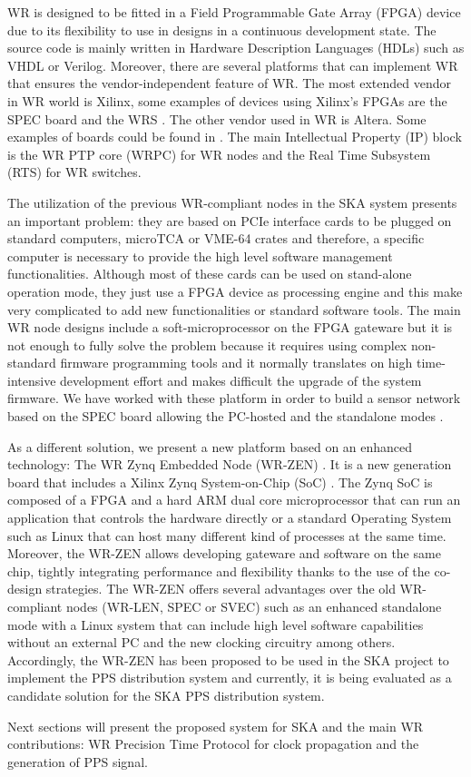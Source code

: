 
WR is designed to be fitted in a Field Programmable Gate Array (FPGA) device due to its flexibility to use in designs in a continuous development state. The source code is mainly written in Hardware Description Languages (HDLs) such as VHDL or Verilog. Moreover, there are several platforms that can implement WR that ensures the vendor-independent feature of WR. The most extended vendor in WR world is Xilinx, some examples of devices using Xilinx's FPGAs are the SPEC board \cite{ohwr:spec} and the WRS \cite{ohwr:wrs}. The other vendor used in WR is Altera. Some examples of boards could be found in \cite{cesar-altera-wr}. The main Intellectual Property (IP) block is the WR PTP core (WRPC) for WR nodes and the Real Time Subsystem (RTS) for WR switches. 

The utilization of the previous WR-compliant nodes in the SKA system presents an important problem: they are based on PCIe interface cards to be plugged on standard computers, microTCA or VME-64 crates and therefore, a specific computer is necessary to provide the high 
level software management functionalities. Although most of these cards can be used on stand-alone operation mode, they just use a FPGA device as processing engine and this make very complicated to add new functionalities or standard software tools. The main WR node designs include a soft-microprocessor on the FPGA gateware but it is not 
enough to fully solve the problem because it requires using complex 
non-standard firmware programming tools and it normally translates on high time-intensive development effort and makes difficult the upgrade of the system firmware. We have worked with these platform in order to build a sensor network based on the SPEC board allowing the PC-hosted and the standalone modes \cite{migueljl-paper-wr-spec}.

As a different solution, we present a new platform based on an enhanced technology: The WR Zynq Embedded Node (WR-ZEN) \cite{sevensols:wr_zen}. It is a new generation board that includes a Xilinx Zynq System-on-Chip (SoC) \cite{xilinx:zynq}. The Zynq SoC is composed of a FPGA and a hard ARM dual core microprocessor that can run an application that controls the hardware directly or a standard Operating System such as Linux that can host many different kind of processes at the same time. Moreover, the WR-ZEN allows developing gateware and software on the same chip, tightly integrating performance and flexibility thanks to the use of the co-design strategies. The WR-ZEN offers several advantages over the old WR-compliant nodes (WR-LEN, SPEC or SVEC) such as an enhanced standalone mode with a Linux system that can include high level software capabilities without an external PC and the new clocking circuitry among others. Accordingly, the WR-ZEN has been proposed to be used in the SKA project to implement the PPS distribution system and currently, it is being evaluated as a candidate solution for the SKA PPS distribution system.  

Next sections will present the proposed system for SKA and the main WR contributions: WR Precision Time Protocol for clock propagation and the generation of PPS signal. 
